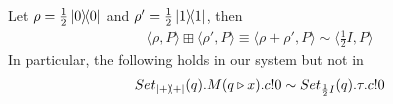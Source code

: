 
\begin{example}
Let $\rho = \frac{1}{2} \ket{0}\!\!\bra{0}$ and $\rho' = \frac{1}{2} \ket{1}\!\!\bra{1}$, then
\begin{align*}
	\langle \rho, P \rangle \boxplus \langle \rho', P \rangle \equiv \langle \rho + \rho', P \rangle \sim \langle \frac{1}{2} I, P \rangle
\end{align*}
In particular, the following holds in our system but not in~\cite{Feng:2012, Deng:2012}
\begin{align*}
	Set_{\ket{+}\!\!\bra{+}}(q).M(q \triangleright x).c!0 \sim Set_{\frac{1}{2} I}(q).\tau.c!0
\end{align*}
\end{example}

